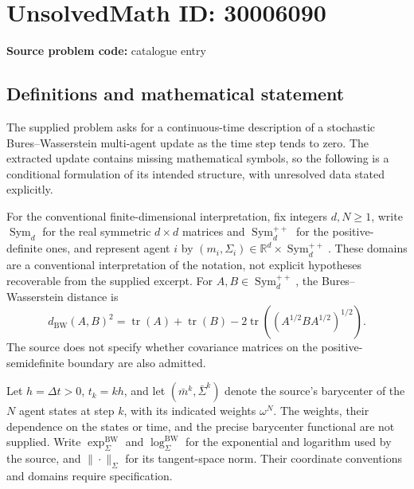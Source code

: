 \documentclass[11pt]{article}
\newcommand{\R}{\mathbb{R}}
\begin{document}
\section*{UnsolvedMath ID: 30006090}
\textbf{Source problem code:} catalogue entry
\subsection{Definitions and mathematical statement}
The supplied problem asks for a continuous-time description of a stochastic Bures--Wasserstein multi-agent update as the time step tends to zero. The extracted update contains missing mathematical symbols, so the following is a conditional formulation of its intended structure, with unresolved data stated explicitly.

For the conventional finite-dimensional interpretation, fix integers \(d,N\geq 1\), write \(\operatorname{Sym}_d\) for the real symmetric \(d\times d\) matrices and \(\operatorname{Sym}_d^{++}\) for the positive-definite ones, and represent agent \(i\) by \((m_i,\Sigma_i)\in\R^d\times\operatorname{Sym}_d^{++}\). These domains are a conventional interpretation of the notation, not explicit hypotheses recoverable from the supplied excerpt. For \(A,B\in\operatorname{Sym}_d^{++}\), the Bures--Wasserstein distance is
\[
 d_{\mathrm{BW}}(A,B)^2
 =\operatorname{tr}(A)+\operatorname{tr}(B)
 -2\operatorname{tr}\!\left((A^{1/2}BA^{1/2})^{1/2}\right).
\]
The source does not specify whether covariance matrices on the positive-semidefinite boundary are also admitted.

Let \(h=\Delta t>0\), \(t_k=kh\), and let \((\bar m^k,\bar\Sigma^k)\) denote the source's barycenter of the \(N\) agent states at step \(k\), with its indicated weights \(\omega^N\). The weights, their dependence on the states or time, and the precise barycenter functional are not supplied. Write \(\exp^{\mathrm{BW}}_\Sigma\) and \(\log^{\mathrm{BW}}_\Sigma\) for the exponential and logarithm used by the source, and \(\|\cdot\|_\Sigma\) for its tangent-space norm. Their coordinate conventions and domains require specification.
\end{document}
